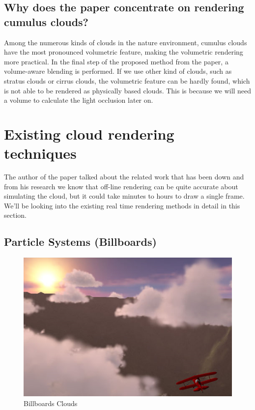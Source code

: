 \subsection{Why does the paper concentrate on rendering cumulus clouds?}
Among the numerous kinds of clouds in the nature environment, cumulus clouds have the most pronounced volumetric feature, making the volumetric rendering more practical. In the final step of the proposed method from the paper, a volume-aware blending is performed. If we use other kind of clouds, such as stratus clouds or cirrus clouds, the volumetric feature can be hardly found, which is not able to be rendered as physically based clouds. This is because we will need a volume to calculate the light occlusion later on.

\section{Existing cloud rendering techniques}
The author of the paper talked about the related work that has been down and from his research we know that off-line rendering can be quite accurate about simulating the cloud, but it could take minutes to hours to draw a single frame. We'll be looking into the existing real time rendering methods in detail in this section.

\subsection{Particle Systems (Billboards)}
\begin{figure}[htp]
\begin{center}
\includegraphics[scale=0.6]{images/billboards.png}
\caption{Billboards Clouds}
\label{f2}
\end{center}
\end{figure}

